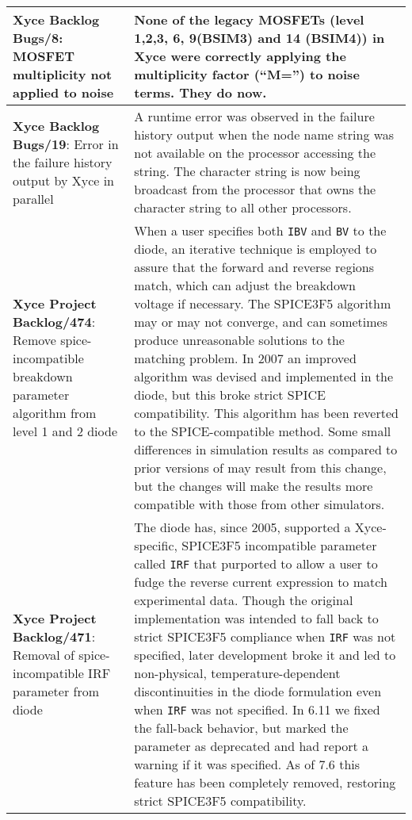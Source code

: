 {\begin{longtable}[h] {>{\raggedright\small}m{2in}|>{\raggedright\let\\\tabularnewline\small}m{3.5in}}
\textbf{Xyce Backlog Bugs/8}: MOSFET multiplicity not applied to noise &
None of the legacy MOSFETs (level 1,2,3, 6, 9(BSIM3) and 14 (BSIM4))
in Xyce were correctly applying the multiplicity factor (``M='') to
noise terms.  They do now. \\ \hline

\textbf{Xyce Backlog Bugs/19}: Error in the failure history output by Xyce in
parallel &  A runtime error was observed in the failure history output when
the node name string was not available on the processor accessing the string.
The character string is now being broadcast from the processor that owns the
character string to all other processors. \\ \hline

\textbf{Xyce Project Backlog/474}: Remove spice-incompatible breakdown parameter algorithm from level 1 and 2 diode &
When a user specifies both \texttt{IBV} and \texttt{BV} to the diode,
an iterative technique is employed to assure that the forward and
reverse regions match, which can adjust the breakdown voltage if
necessary.  The SPICE3F5 algorithm may or may not converge, and can
sometimes produce unreasonable solutions to the matching problem.  In
2007 an improved algorithm was devised and implemented in the \Xyce{}
diode, but this broke strict SPICE compatibility.  This algorithm has
been reverted to the SPICE-compatible method.  Some small differences
in simulation results as compared to prior versions of \Xyce{} may
result from this change, but the changes will make the results more
compatible with those from other simulators.  \\ \hline

\textbf{Xyce Project Backlog/471}: Removal of spice-incompatible IRF parameter from diode &
The \Xyce{} diode has, since 2005, supported a Xyce-specific, SPICE3F5
incompatible parameter called \texttt{IRF} that purported to allow a
user to fudge the reverse current expression to match experimental
data.  Though the original implementation was intended to fall back to
strict SPICE3F5 compliance when \texttt{IRF} was not specified, later
development broke it and led to non-physical, temperature-dependent
discontinuities in the diode formulation even when \texttt{IRF} was
not specified.  In \Xyce{} 6.11 we fixed the fall-back behavior, but
marked the parameter as deprecated and had \Xyce{} report a warning if
it was specified.  As of \Xyce{} 7.6 this feature has been completely
removed, restoring strict SPICE3F5 compatibility. \\ \hline


\end{longtable}}
